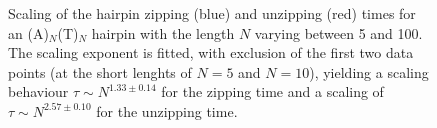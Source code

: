 \begin{figure}[htb]
       \begin{center}
               \scalebox{0.9}{
                        \nonstopmode
                        
                        \errorstopmode
                        \rule[-0.5cm]{0cm}{0cm}}
                \caption{Scaling of the hairpin zipping (blue) and unzipping (red) times for an (A)$_N$(T)$_N$ hairpin with the length $N$ varying between 5 and 100. The scaling exponent is fitted, with exclusion of the first two data points (at the short lenghts of $N = 5$ and $N = 10$), yielding a scaling behaviour $\tau \sim N^{1.33 \pm 0.14}$ for the zipping time and a scaling of $\tau \sim N^{2.57 \pm 0.10}$ for the unzipping time.}
                \label{hairpinScaling}
        \end{center}
\end{figure}


